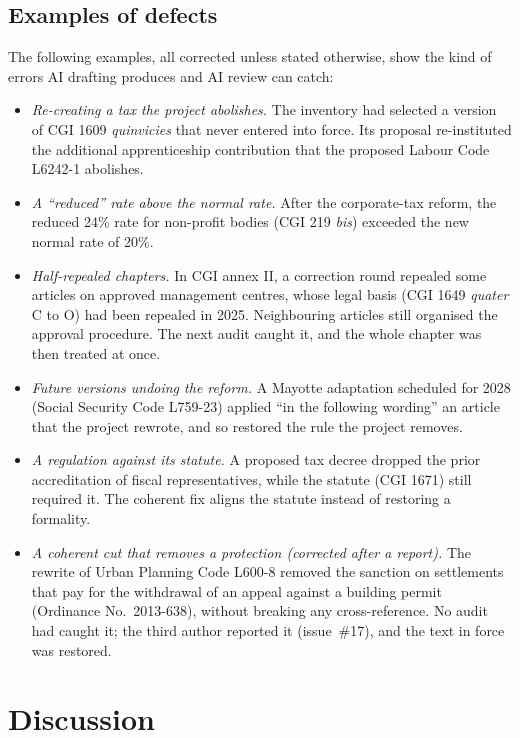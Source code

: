 \documentclass[11pt,a4paper]{article}
\begin{document}
\subsection{Examples of defects}

The following examples, all corrected unless stated otherwise, show the kind of errors AI drafting produces and AI review can catch:
\begin{itemize}
  \item \emph{Re-creating a tax the project abolishes.} The inventory had selected a version of CGI 1609 \emph{quinvicies} that never entered into force. Its proposal re-instituted the additional apprenticeship contribution that the proposed Labour Code L6242-1 abolishes.
  \item \emph{A ``reduced'' rate above the normal rate.} After the corporate-tax reform, the reduced 24\% rate for non-profit bodies (CGI 219 \emph{bis}) exceeded the new normal rate of 20\%.
  \item \emph{Half-repealed chapters.} In CGI annex II, a correction round repealed some articles on approved management centres, whose legal basis (CGI 1649 \emph{quater} C to O) had been repealed in 2025. Neighbouring articles still organised the approval procedure. The next audit caught it, and the whole chapter was then treated at once.
  \item \emph{Future versions undoing the reform.} A Mayotte adaptation scheduled for 2028 (Social Security Code L759-23) applied ``in the following wording'' an article that the project rewrote, and so restored the rule the project removes.
  \item \emph{A regulation against its statute.} A proposed tax decree dropped the prior accreditation of fiscal representatives, while the statute (CGI 1671) still required it. The coherent fix aligns the statute instead of restoring a formality.
  \item \emph{A coherent cut that removes a protection (corrected after a report).} The rewrite of Urban Planning Code L600-8 removed the sanction on settlements that pay for the withdrawal of an appeal against a building permit (Ordinance No.~2013-638), without breaking any cross-reference. No audit had caught it; the third author reported it (issue~\#17), and the text in force was restored.
\end{itemize}

\section{Discussion}
\label{sec:discussion}
\end{document}
